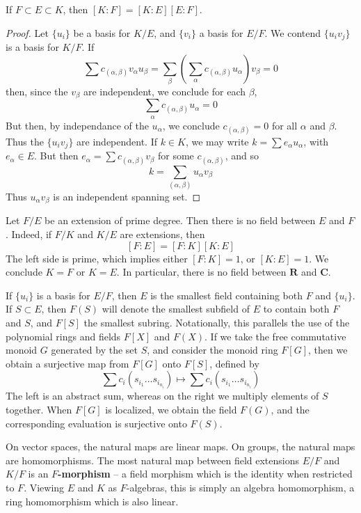 \begin{theorem}
    If $F \subset E \subset K$, then $[K:F] = [K: E][E: F]$.
\end{theorem}
\begin{proof}
    Let $\{ u_i \}$ be a basis for $K/E$, and $\{ v_i \}$ a basis for $E/F$. We contend $\{ u_i v_j \}$ is a basis for $K/F$. If
    \[ \sum c_{(\alpha,\beta)} v_\alpha u_\beta = \sum_\beta \left( \sum_\alpha c_{(\alpha, \beta)} u_\alpha \right) v_\beta = 0 \]
    then, since the $v_\beta$ are independent, we conclude for each $\beta$,
    \[ \sum_\alpha c_{(\alpha, \beta)} u_\alpha = 0 \]
    But then, by independance of the $u_\alpha$, we conclude $c_{(\alpha, \beta)} = 0$ for all $\alpha$ and $\beta$. Thus the $\{ u_i v_j \}$ are independent. If $k \in K$, we may write $k = \sum e_\alpha u_\alpha$, with $e_\alpha \in E$. But then $e_\alpha = \sum c_{(\alpha, \beta)} v_\beta$ for some $c_{(\alpha, \beta)}$, and so
    \[ k = \sum_{(\alpha, \beta)} u_\alpha v_\beta \]
    Thus $u_\alpha v_\beta$ is an independent spanning set.
\end{proof}

\begin{example}
    Let $F/E$ be an extension of prime degree. Then there is no field between $E$ and $F$. Indeed, if $F/K$ and $K/E$ are extensions, then
    \[ [F:E] = [F:K][K:E] \]
    The left side is prime, which implies either $[F:K] = 1$, or $[K:E] = 1$. We conclude $K = F$ or $K = E$. In particular, there is no field between $\mathbf{R}$ and $\mathbf{C}$.
\end{example}

If $\{ u_i \}$ is a basis for $E/F$, then $E$ is the smallest field containing both $F$ and $\{ u_i \}$. If $S \subset E$, then $F(S)$ will denote the smallest subfield of $E$ to contain both $F$ and $S$, and $F[S]$ the smallest subring. Notationally, this parallels the use of the polynomial rings and fields $F[X]$ and $F(X)$. If we take the free commutative monoid $G$ generated by the set $S$, and consider the monoid ring $F[G]$, then we obtain a surjective map from $F[G]$ onto $F[S]$, defined by
%
\[ \sum c_i (s_{i_1} \dots s_{i_{n_i}}) \mapsto \sum c_i (s_{i_1} \dots s_{i_{n_i}}) \]
%
The left is an abstract sum, whereas on the right we multiply elements of $S$ together. When $F[G]$ is localized, we obtain the field $F(G)$, and the corresponding evaluation is surjective onto $F(S)$.

On vector spaces, the natural maps are linear maps. On groups, the natural maps are homomorphisms. The most natural map between field extensions $E/F$ and $K/F$ is an {\bf $F$-morphism} -- a field morphism which is the identity when restricted to $F$. Viewing $E$ and $K$ as $F$-algebras, this is simply an algebra homomorphism, a ring homomorphism which is also linear.

